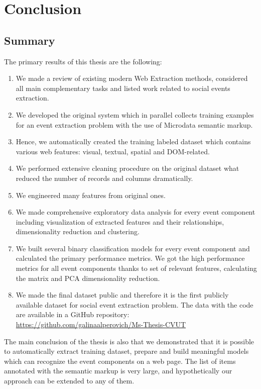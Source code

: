 \chapter{Conclusion}
\label{chap:conclusion}

\section{Summary}

The primary results of this thesis are the following: 
\begin{enumerate}
    \item We made a review of existing modern Web Extraction methods, considered all main complementary tasks and listed work related to social events extraction.   
    \item We developed the original system which in parallel collects training examples for an event extraction problem with the use of Microdata semantic markup.
    \item Hence, we automatically created the training labeled dataset which contains various web features: visual, textual, spatial and DOM-related.
    \item We performed extensive cleaning procedure on the original dataset what reduced the number of records and columns dramatically.
    \item We engineered many features from original ones.
    \item We made comprehensive exploratory data analysis for every event component including visualization of extracted features and their relationships, dimensionality reduction and clustering.
    \item We built several binary classification models for every event component and calculated the primary performance metrics. We got the high performance metrics for all event components thanks to set of relevant features, calculating the  matrix and PCA dimensionality reduction.
    \item We made the final dataset public and therefore it is the first publicly available dataset for social event extraction problem. The data with the code are available in a GitHub repository: \url{https://github.com/galinaalperovich/Ms-Thesis-CVUT}
\end{enumerate}

The main conclusion of the thesis is also that we demonstrated that it is possible to automatically extract training dataset, prepare and build meaningful models which can recognize the event components on a web page. The list of items annotated with the semantic markup is very large, and hypothetically our approach can be extended to any of them. 


